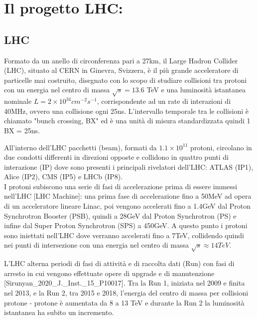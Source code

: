 \chapter{Il progetto LHC:}


\section{LHC}
Formato da un anello di circonferenza pari a 27km, il Large Hadron Collider (LHC), situato al CERN in Ginevra, Svizzera, è il più grande acceleratore di particelle mai costruito, disegnato con lo scopo di studiare collisioni tra protoni con un energia nel centro di massa $\sqrt{s} = 13.6$ TeV e una luminosità istantanea nominale $L = 2 \times 10^{34} cm^{-2} s^{-1}$, corrispondente ad un rate di interazioni di 40MHz, ovvero una collisione ogni 25ns. L'intervallo temporale tra le collisioni è chiamato "bunch crossing, BX" ed è una unità di misura standardizzata quindi 1 BX = 25ns.


All'interno dell'LHC pacchetti (beam), formati da $1.1 \times 10^{11}$ protoni, circolano in due condotti differenti in direzioni opposte e collidono in quattro punti di interazione (IP) dove sono presenti i principali rivelatori dell'LHC: ATLAS (IP1), Alice (IP2), CMS (IP5) e LHCb (IP8).\\

I protoni subiscono una serie di fasi di accelerazione prima di essere immessi nell'LHC [LHC Machine]: una prima fase di accelerazione fino a 50MeV ad opera di un acceleratore lineare Linac, poi vengono accelerati fino a 1.4GeV dal Proton Synchrotron Booster (PSB), quindi a 28GeV dal Proton Synchrotron (PS) e infine dal Super Proton Synchrotron (SPS) a 450GeV. A questo punto i protoni sono iniettati nell'LHC dove verranno accelerati fino a 7TeV, collidendo quindi nei punti di intersezione con una energia nel centro di massa $\sqrt{s} \approx 14TeV$.

L'LHC alterna periodi di fasi di attività e di raccolta dati (Run) con fasi di arresto in cui vengono effettuate opere di upgrade e di manutenzione [Sirunyan_2020_J._Inst._15_P10017]. Tra la Run 1, iniziata nel 2009 e finita nel 2013, e la Run 2, tra 2015 e 2018, l'energia del centro di massa per collisioni protone - protone è aumentata da 8 a 13 TeV e durante la Run 2 la luminosità istantanea ha subito un incremento.




